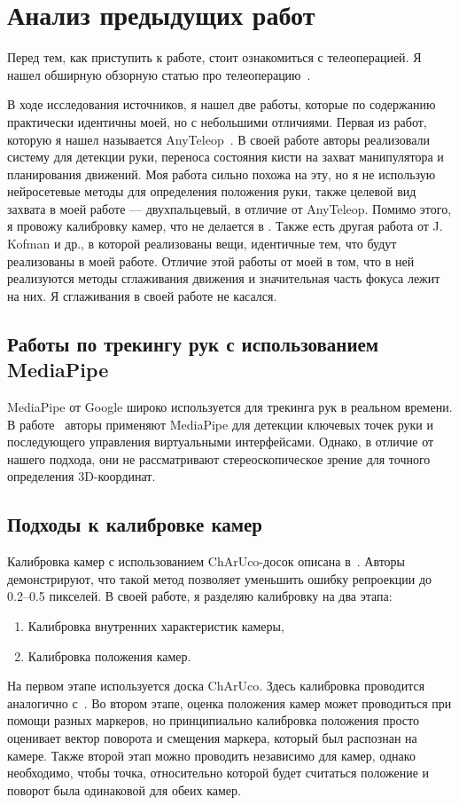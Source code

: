 \documentclass[12pt, a4paper]{article}
\begin{document}
\section{Анализ предыдущих работ}
  Перед тем, как приступить к работе, стоит ознакомиться с телеоперацией. Я
  нашел обширную обзорную статью про телеоперацию~\cite{teleop-survey}.

  В ходе исследования источников, я нашел две работы, которые по содержанию
  практически идентичны моей, но с небольшими отличиями. Первая из работ,
  которую я нашел называется AnyTeleop~\cite{anyteleop}. В своей работе авторы
  реализовали систему для детекции руки, переноса состояния кисти на захват
  манипулятора и планирования движений. Моя работа сильно похожа на эту, но я
  не использую нейросетевые методы для определения положения руки, также
  целевой вид захвата в моей работе --- двухпальцевый, в отличие от AnyTeleop.
  Помимо этого, я провожу калибровку камер, что не делается в \cite{anyteleop}.
  Также есть другая работа от J. Kofman и др.\cite{literally-me}, в которой
  реализованы вещи, идентичные тем, что будут реализованы в моей работе.
  Отличие этой работы от моей в том, что в ней реализуются методы сглаживания
  движения и значительная часть фокуса лежит на них. Я сглаживания в своей
  работе не касался.
  

    \subsection{Работы по трекингу рук с использованием MediaPipe}
        MediaPipe от Google широко используется для трекинга рук в реальном
        времени. В работе~\cite{mediapipe_hands} авторы применяют MediaPipe для
        детекции ключевых точек руки и последующего управления виртуальными
        интерфейсами. Однако, в отличие от нашего подхода, они не рассматривают
        стереоскопическое зрение для точного определения 3D-координат.
    
    \subsection{Подходы к калибровке камер}
        Калибровка камер с использованием ChArUco-досок описана в~\cite{opencv_charuco}. Авторы демонстрируют, что такой метод позволяет уменьшить ошибку репроекции до 0.2--0.5 пикселей.
        В своей работе, я разделяю калибровку на два этапа:
        \begin{enumerate}
            \item Калибровка внутренних характеристик камеры,
            \item Калибровка положения камер.
        \end{enumerate}
        На первом этапе используется доска ChArUco. Здесь калибровка проводится аналогично с~\cite{opencv_charuco}.
        Во втором этапе, оценка положения камер может проводиться при помощи разных маркеров, но принципиально калибровка положения просто оценивает вектор поворота и смещения маркера, который был распознан на камере.
        Также второй этап можно проводить независимо для камер, однако необходимо, чтобы
        точка, относительно которой будет считаться положение и поворот была одинаковой для обеих камер.
    
\end{document}
